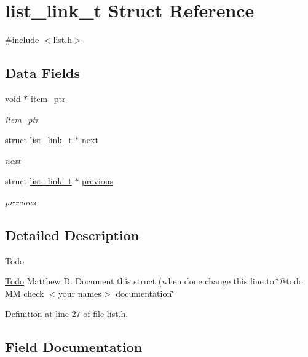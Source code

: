\hypertarget{structlist__link__t}{}\section{list\+\_\+link\+\_\+t Struct Reference}
\label{structlist__link__t}


{\ttfamily \#include $<$list.\+h$>$}

\subsection*{Data Fields}
\begin{DoxyCompactItemize}
\item 
void $\ast$ \hyperlink{structlist__link__t_aec51f80a940b56db16311a7ec2700ed3}{item\+\_\+ptr}
\begin{DoxyCompactList}\small\item\em item\+\_\+ptr \end{DoxyCompactList}\item 
struct \hyperlink{structlist__link__t}{list\+\_\+link\+\_\+t} $\ast$ \hyperlink{structlist__link__t_ab0e8377d8d84faece172731f34f19398}{next}
\begin{DoxyCompactList}\small\item\em next \end{DoxyCompactList}\item 
struct \hyperlink{structlist__link__t}{list\+\_\+link\+\_\+t} $\ast$ \hyperlink{structlist__link__t_a96afc5312540737fde40567866eef3a7}{previous}
\begin{DoxyCompactList}\small\item\em previous \end{DoxyCompactList}\end{DoxyCompactItemize}


\subsection{Detailed Description}
\begin{DoxyRefDesc}{Todo}
\item[\hyperlink{todo__todo000011}{Todo}]Matthew D. Document this struct (when done change this line to \char`\"{}@todo M\+M check $<$your names$>$ documentation\char`\"{} \end{DoxyRefDesc}


Definition at line 27 of file list.\+h.



\subsection{Field Documentation}
\hypertarget{structlist__link__t_aec51f80a940b56db16311a7ec2700ed3}{}
